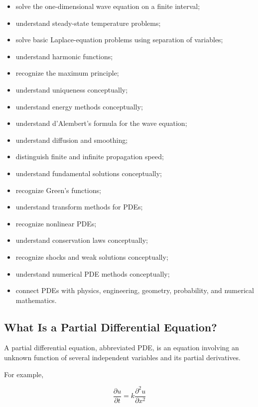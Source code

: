 {\begin{itemize}
    \item solve the one-dimensional wave equation on a finite interval;
    \item understand steady-state temperature problems;
    \item solve basic Laplace-equation problems using separation of
          variables;
    \item understand harmonic functions;
    \item recognize the maximum principle;
    \item understand uniqueness conceptually;
    \item understand energy methods conceptually;
    \item understand d'Alembert's formula for the wave equation;
    \item understand diffusion and smoothing;
    \item distinguish finite and infinite propagation speed;
    \item understand fundamental solutions conceptually;
    \item recognize Green's functions;
    \item understand transform methods for PDEs;
    \item recognize nonlinear PDEs;
    \item understand conservation laws conceptually;
    \item recognize shocks and weak solutions conceptually;
    \item understand numerical PDE methods conceptually;
    \item connect PDEs with physics, engineering, geometry, probability,
          and numerical mathematics.
\end{itemize}
}

\subsection{What Is a Partial Differential Equation?}
\label{subsec:what-is-pde}

A partial differential equation, abbreviated PDE, is an equation involving
an unknown function of several independent variables and its partial
derivatives.

For example,

\[
\boxed{
\frac{\partial u}{\partial t}
=
k
\frac{\partial^2u}{\partial x^2}
}
\]


